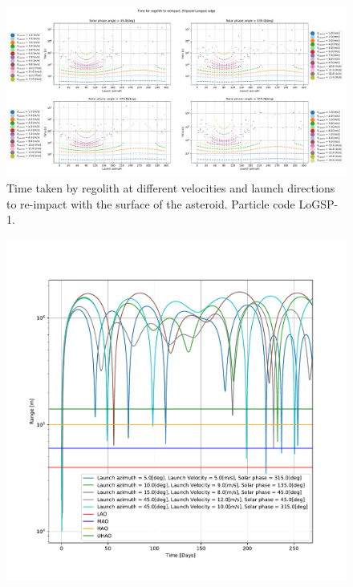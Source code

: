 \documentclass[print]{tudelft-report}
\begin{document}
\begin{appendices}
\begin{figure}[htb]
    \label{fig:LoGSP_1_maxAltitude_reimpactscenario}
    \end{figure}
    \FloatBarrier
    \begin{figure}[htb]
    \centering
    \captionsetup{justification=centering}
    \includegraphics[angle=90, width=\textwidth, height=\textheight, keepaspectratio=true]{Results/Images/longest_edge_perturbations/3.2Density_1cmSize/time_to_reimpact_all_solar_phases.pdf}
    \caption{Time taken by regolith at different velocities and launch directions to re-impact with the surface of the asteroid. Particle code LoGSP-1.}
    \label{fig:LoGSP_1_reimpact_time}
    \end{figure}
    \FloatBarrier
    \begin{figure}[p]
    \centering
    \captionsetup{justification=centering}
    \includegraphics[scale=0.5]{Results/Images/longest_edge_perturbations/3.2Density_1cmSize/altitude_versus_time_all_cases_part_1.pdf}

\end{figure}
\end{appendices}
\end{document}
